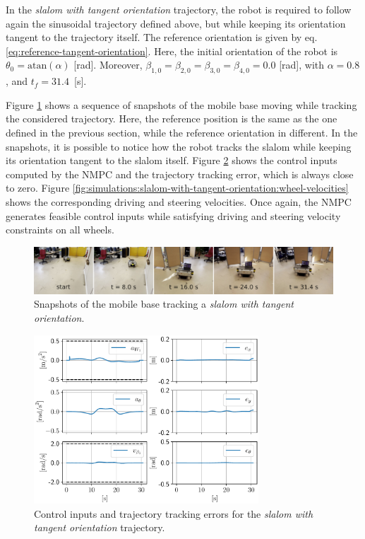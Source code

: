 In the \textit{slalom with tangent orientation} trajectory, the robot is
required to follow again the sinusoidal trajectory defined above, but while
keeping its orientation tangent to the trajectory itself.
The reference orientation is given by eq. \eqref{eq:reference-tangent-orientation}.
Here, the initial orientation of the robot is $\theta_0=\mathrm{atan}(\alpha)$
[rad]. Moreover, $\beta_{1,0}=\beta_{2,0}=\beta_{3,0}=\beta_{4,0}=0.0$ [rad],
with $\alpha=0.8$, and $t_f=31.4$~[s].

Figure \ref{fig:experiments:slalom-with-tangent-orientation:snapshots} shows
a sequence of snapshots of the mobile base moving while tracking the
considered trajectory. Here, the reference position is the same as the one
defined in the previous section, while the reference orientation in different.
In the snapshots, it is possible to notice how the robot tracks the slalom
while keeping its orientation tangent to the slalom itself.
Figure \ref{fig:simulations:slalom-with-tangent-orientation:inputs-and-errors}
shows the control inputs computed by the NMPC and the trajectory tracking error,
which is always close to zero.
Figure \ref{fig:simulations:slalom-with-tangent-orientation:wheel-velocities}
shows the corresponding driving and steering velocities.
Once again, the NMPC generates feasible control inputs while satisfying driving
and steering velocity constraints on all wheels.
\begin{figure}
    \centering
    \includegraphics[width=\textwidth]{figures/SWMR/simulations/slalom_with_tangent_orientation/snapshots.jpeg}
    \caption{Snapshots of the mobile base tracking a \textit{slalom with tangent orientation}.}
    \label{fig:experiments:slalom-with-tangent-orientation:snapshots}
\end{figure}
\begin{figure}
    \centering
    \includegraphics[width=0.75\textwidth]{figures/SWMR/simulations/slalom_with_tangent_orientation/inputs_and_errors.pdf}
    \caption{Control inputs and trajectory tracking errors for the
        \textit{slalom with tangent orientation} trajectory.
    }
    \label{fig:simulations:slalom-with-tangent-orientation:inputs-and-errors}
\end{figure}
